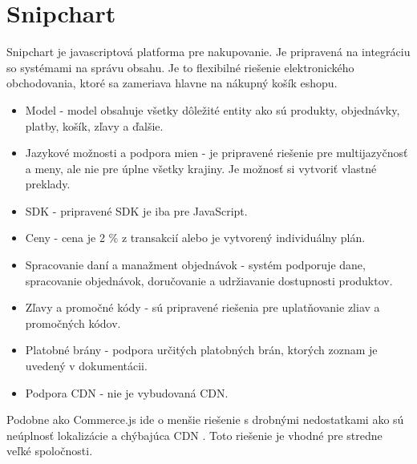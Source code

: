 \documentclass[
  printed, %
  table,   %
  lof,     %
  nolot,     %
  twoside,  
]{fithesis3}
\begin{document}
\section{Snipchart}
Snipchart je javascriptová platforma pre nakupovanie. Je pripravená na integráciu so systémami na správu obsahu. Je to flexibilné riešenie elektronického obchodovania, ktoré sa zameriava hlavne na nákupný košík eshopu.
\begin{itemize}
	\item Model - model  obsahuje všetky dôležité entity ako sú produkty, objednávky, platby, košík, zľavy a ďalšie.
	\item Jazykové možnosti a podpora mien - je pripravené riešenie pre multijazyčnosť a meny, ale nie pre úplne všetky krajiny. Je možnosť si vytvoriť vlastné preklady.
	\item SDK - pripravené SDK je iba pre JavaScript.
	\item Ceny - cena je 2 \% z transakcií alebo je vytvorený individuálny plán.
	\item Spracovanie daní a manažment objednávok - systém podporuje dane, spracovanie objednávok, doručovanie a udržiavanie dostupnosti produktov. 
	\item Zľavy a promočné kódy - sú pripravené riešenia pre uplatňovanie zliav a promočných kódov.
	\item Platobné brány - podpora určitých platobných brán, ktorých zoznam je uvedený v dokumentácii.
	\item Podpora CDN - nie je vybudovaná CDN.
\end{itemize}
Podobne ako Commerce.js ide o menšie riešenie s drobnými nedostatkami ako sú neúplnosť lokalizácie a chýbajúca CDN \cite{Snipchart}. Toto riešenie je vhodné pre stredne veľké spoločnosti.
		
\end{document}
